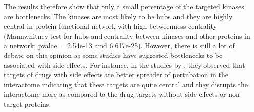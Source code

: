 \documentclass[a4paper, 11pt]{report}
\newcommand{\redcomment}[1]{\textcolor{red}{[#1]}} %
\begin{document}
The results therefore show that only a small percentage of the targeted kinases are bottlenecks. The kinases are most likely to be hubs and they are highly central in protein functional network with high betweenness centrality (Mannwhitney test for hubs and centrality between kinases and other proteins in a network; pvalue = 2.54e-13 amd 6.617e-25). However, there is still a lot of debate on this opinion as some studies have suggested bottlenecks to be associated with side effects.  For instance, in the studies by \cite{perez2015targets}, they observed that targets of drugs with side effects are better spreader of pertubation in the interactome indicating that these targets are quite central and they disrupts the interactome more as compared to the drug-targets without side effects or non-target proteins. %
\end{document}

